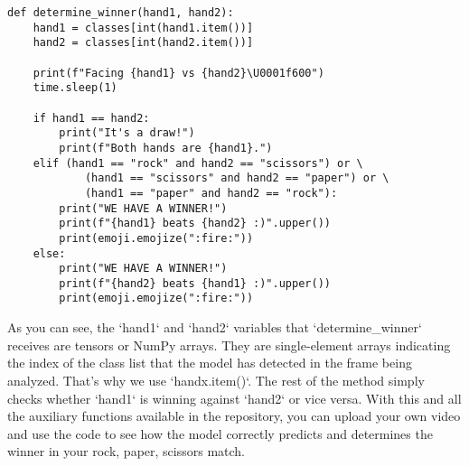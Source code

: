 \documentclass[../main]{subfiles}
\begin{document}
\begin{lstlisting}
def determine_winner(hand1, hand2):
    hand1 = classes[int(hand1.item())]
    hand2 = classes[int(hand2.item())]

    print(f"Facing {hand1} vs {hand2}\U0001f600")
    time.sleep(1)

    if hand1 == hand2:
        print("It's a draw!")
        print(f"Both hands are {hand1}.")
    elif (hand1 == "rock" and hand2 == "scissors") or \
            (hand1 == "scissors" and hand2 == "paper") or \
            (hand1 == "paper" and hand2 == "rock"):
        print("WE HAVE A WINNER!")
        print(f"{hand1} beats {hand2} :)".upper())
        print(emoji.emojize(":fire:"))
    else:
        print("WE HAVE A WINNER!")
        print(f"{hand2} beats {hand1} :)".upper())
        print(emoji.emojize(":fire:"))
\end{lstlisting}
As you can see, the `hand1` and `hand2` variables that `determine\_winner` receives are tensors or NumPy arrays. They are single-element arrays indicating the index of the class list that the model has detected in the frame being analyzed. That’s why we use `handx.item()`. The rest of the method simply checks whether `hand1` is winning against `hand2` or vice versa. With this and all the auxiliary functions available in the repository, you can upload your own video and use the code to see how the model correctly predicts and determines the winner in your rock, paper, scissors match.
\end{document}

